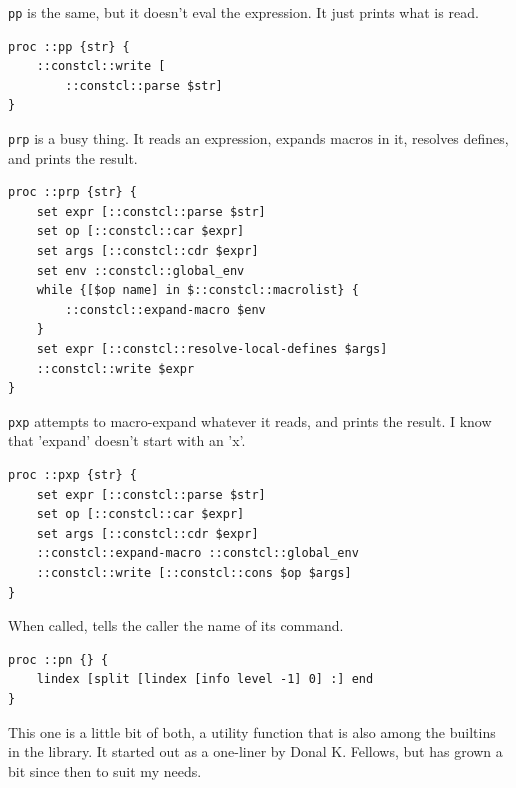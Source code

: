 \documentclass[twoside,9pt]{report}
\begin{document}
\texttt{pp} is the same, but it doesn't eval the expression. It just prints what is read.

\noindent\makebox[\linewidth]{\rule{\linewidth}{0.4pt}}
\begin{lstlisting}
proc ::pp {str} {
    ::constcl::write [
        ::constcl::parse $str]
}
\end{lstlisting}
\noindent\makebox[\linewidth]{\rule{\linewidth}{0.4pt}}

\texttt{prp} is a busy thing. It reads an expression, expands macros in it, resolves defines, and prints the result.

\noindent\makebox[\linewidth]{\rule{\linewidth}{0.4pt}}
\begin{lstlisting}
proc ::prp {str} {
    set expr [::constcl::parse $str]
    set op [::constcl::car $expr]
    set args [::constcl::cdr $expr]
    set env ::constcl::global_env
    while {[$op name] in $::constcl::macrolist} {
        ::constcl::expand-macro $env
    }
    set expr [::constcl::resolve-local-defines $args]
    ::constcl::write $expr
}
\end{lstlisting}
\noindent\makebox[\linewidth]{\rule{\linewidth}{0.4pt}}

\texttt{pxp} attempts to macro-expand whatever it reads, and prints the result. I know that 'expand' doesn't start with an 'x'.

\noindent\makebox[\linewidth]{\rule{\linewidth}{0.4pt}}
\begin{lstlisting}
proc ::pxp {str} {
    set expr [::constcl::parse $str]
    set op [::constcl::car $expr]
    set args [::constcl::cdr $expr]
    ::constcl::expand-macro ::constcl::global_env
    ::constcl::write [::constcl::cons $op $args]
}
\end{lstlisting}
\noindent\makebox[\linewidth]{\rule{\linewidth}{0.4pt}}

When called, tells the caller the name of its command.

\noindent\makebox[\linewidth]{\rule{\linewidth}{0.4pt}}
\begin{lstlisting}
proc ::pn {} {
    lindex [split [lindex [info level -1] 0] :] end
}
\end{lstlisting}
\noindent\makebox[\linewidth]{\rule{\linewidth}{0.4pt}}

This one is a little bit of both, a utility function that is also among the builtins in the library. It started out as a one-liner by Donal K. Fellows, but has grown a bit since then to suit my needs.
\end{document}
